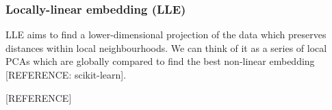 \documentclass[journal, a4paper]{IEEEtran}
\begin{document}

%

\subsubsection{Locally-linear embedding (LLE)}


LLE aims to find a lower-dimensional projection of the data which preserves distances within local neighbourhoods. We can think of it as a series of local PCAs which are globally compared to find the best non-linear embedding [REFERENCE: scikit-learn].



%

[REFERENCE]
\end{document}
